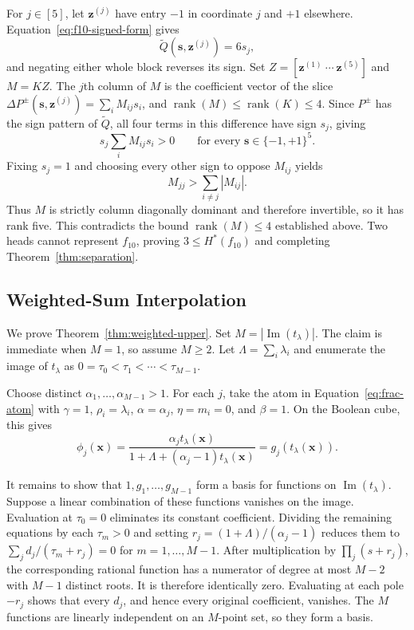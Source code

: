 \documentclass{article}
\theoremstyle{definition}
\theoremstyle{plain}
\newcommand{\hstar}{H^{\ast}}
\begin{document}
For $j\in[5]$, let $\mathbf{z}^{(j)}$ have entry $-1$ in coordinate $j$ and $+1$ elsewhere. Equation~\eqref{eq:f10-signed-form} gives
\begin{equation}
\widetilde Q(\mathbf{s},\mathbf{z}^{(j)})=6s_j,
\end{equation}
and negating either whole block reverses its sign. Set $Z=[\mathbf{z}^{(1)}\ \cdots\ \mathbf{z}^{(5)}]$ and $M=KZ$. The $j$th column of $M$ is the coefficient vector of the slice $\Delta P^{\pm}(\mathbf{s},\mathbf{z}^{(j)})=\sum_i M_{ij}s_i$, and $\operatorname{rank}(M)\leq\operatorname{rank}(K)\leq4$. Since $P^{\pm}$ has the sign pattern of $\widetilde Q$, all four terms in this difference have sign $s_j$, giving
\begin{equation}
s_j\sum_iM_{ij}s_i>0
\qquad\text{for every }\mathbf{s}\in\{-1,+1\}^5.
\end{equation}
Fixing $s_j=1$ and choosing every other sign to oppose $M_{ij}$ yields
\begin{equation}
M_{jj}>\sum_{i\neq j}|M_{ij}|.
\end{equation}
Thus $M$ is strictly column diagonally dominant and therefore invertible, so it has rank five. This contradicts the bound $\operatorname{rank}(M)\leq4$ established above. Two heads cannot represent $f_{10}$, proving $3\leq\hstar(f_{10})$ and completing Theorem~\ref{thm:separation}.

\subsection{Weighted-Sum Interpolation}
\label{app:proof-weighted}

We prove Theorem~\ref{thm:weighted-upper}. Set $M=|\operatorname{Im}(t_\lambda)|$. The claim is immediate when $M=1$, so assume $M\geq2$. Let $\Lambda=\sum_i\lambda_i$ and enumerate the image of $t_\lambda$ as $0=\tau_0<\tau_1<\cdots<\tau_{M-1}$.

Choose distinct $\alpha_1,\ldots,\alpha_{M-1}>1$. For each $j$, take the atom in Equation~\eqref{eq:frac-atom} with $\gamma=1$, $\rho_i=\lambda_i$, $\alpha=\alpha_j$, $\eta=m_i=0$, and $\beta=1$. On the Boolean cube, this gives
\begin{equation}
\phi_j(\mathbf{x})=\frac{\alpha_j t_\lambda(\mathbf{x})}{1+\Lambda+(\alpha_j-1)t_\lambda(\mathbf{x})}
=g_j(t_\lambda(\mathbf{x})).
\label{eq:weighted-response}
\end{equation}

It remains to show that $1,g_1,\ldots,g_{M-1}$ form a basis for functions on $\operatorname{Im}(t_\lambda)$. Suppose a linear combination of these functions vanishes on the image. Evaluation at $\tau_0=0$ eliminates its constant coefficient. Dividing the remaining equations by each $\tau_m>0$ and setting $r_j=(1+\Lambda)/(\alpha_j-1)$ reduces them to $\sum_jd_j/(\tau_m+r_j)=0$ for $m=1,\ldots,M-1$. After multiplication by $\prod_j(s+r_j)$, the corresponding rational function has a numerator of degree at most $M-2$ with $M-1$ distinct roots. It is therefore identically zero. Evaluating at each pole $-r_j$ shows that every $d_j$, and hence every original coefficient, vanishes. The $M$ functions are linearly independent on an $M$-point set, so they form a basis.
\end{document}
